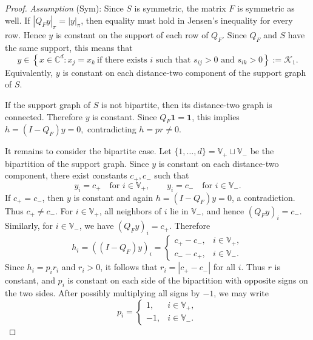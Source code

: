 \documentclass[11pt,twoside, a4paper]{article}
\numberwithin{equation}{section}
\numberwithin{figure}{section}
\theoremstyle{plain} %
\theoremstyle{definition}
\theoremstyle{remark}
\newcommand{\1} {\mspace{1 mu}}
\newcommand{\2} {\mspace{2 mu}}
\newcommand{\C} {{\mathbb{C}}}
\begin{document}
\begin{proof}
  \smallskip

  \textit{Assumption} (Sym): Since \(S\) is symmetric, the matrix $F$ is symmetric as well. 
    If $|Q_Fy|_\pi=|y|_\pi$, then equality must hold in Jensen's inequality for every
    row. Hence \(y\) is constant on the support of each row of \(Q_F\). Since
    $Q_F$ and $S$ have the same support, this means that
    \[
        y\in\left\{x\in\C^d: x_j=x_k~
        \text{if there exists } i \text{ such that } s_{ij}>0
        \text{ and } s_{ik}>0\right\}:=\mathcal{K}_1.
    \]
    Equivalently, \(y\) is constant on each distance-two component of the
    support graph of \(S\).

    If the support graph of \(S\) is not bipartite, then its distance-two graph
    is connected. Therefore \(y\) is constant. Since \(Q_F\mathbf1=\mathbf1\), this
    implies
    $
        h=(I-Q_F)y=0,
    $
    contradicting \(h=pr\ne0\).

    It remains to consider the bipartite case. Let
    $
        \{1,\dots,d\}=\mathbb V_+\sqcup\mathbb V_-
    $
    be the bipartition of the support graph. Since \(y\) is constant on each
    distance-two component, there exist constants \(c_+,c_-\) such that
    \[
        y_i=c_+\quad\text{for }i\in\mathbb V_+,
        \qquad
        y_i=c_-\quad\text{for }i\in\mathbb V_- .
    \]
    If \(c_+=c_-\), then \(y\) is constant and again \(h=(I-Q_F)y=0\), a
    contradiction. Thus \(c_+\ne c_-\). For \(i\in\mathbb V_+\), all neighbors
    of \(i\) lie in \(\mathbb V_-\), and hence
    $
        (Q_Fy)_i=c_-.
    $
    Similarly, for \(i\in\mathbb V_-\), we have \((Q_Fy)_i=c_+\). Therefore
    \[
        h_i=((I-Q_F)y)_i
        =
        \begin{cases}
            c_+-c_-, & i\in\mathbb V_+,\\
            c_--c_+, & i\in\mathbb V_-.
        \end{cases}
    \]
    Since \(h_i=p_i r_i\) and \(r_i>0\), it follows that \(r_i=|c_+-c_-|\) for
    all \(i\). Thus \(r\) is constant, and \(p_i\) is constant on each side of
    the bipartition with opposite signs on the two sides. After possibly
    multiplying all signs by \(-1\), we may write
    \[
        p_i=
        \begin{cases}
            1, & i\in\mathbb V_+,\\
            -1, & i\in\mathbb V_-.
        \end{cases}
    \]


\end{proof}
\end{document}
